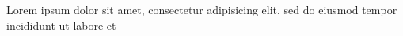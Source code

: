 \documentclass{article}
\begin{document}
Lorem ipsum dolor sit amet, consectetur adipisicing elit, sed do eiusmod
tempor incididunt ut labore et
\end{document}
